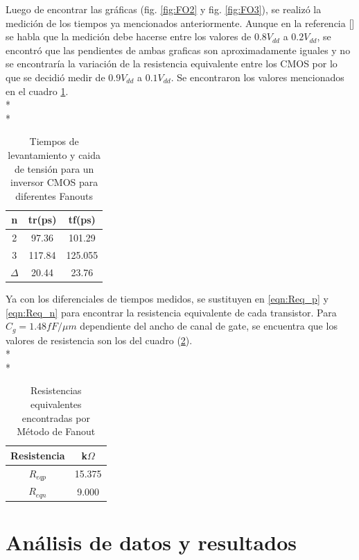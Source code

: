\documentclass[12pt,a4paper]{article} %
\begin{document}
Luego de encontrar las gráficas (fig. \ref{fig:FO2} y fig. \ref{fig:FO3}), se realizó la medición de los tiempos ya mencionados anteriormente. Aunque en la referencia [] se habla que la medición debe hacerse entre los valores de $0.8V_{dd}$ a $0.2V_{dd}$, se encontró que las pendientes de ambas graficas son aproximadamente iguales y no se encontraría la variación de la resistencia equivalente entre los CMOS por lo que se decidió medir de $0.9V_{dd}$ a $0.1V_{dd}$. Se encontraron los valores mencionados en el cuadro \ref{table:tiempos}. \\*
\\*
\begin{table}\label{table:tiempos}
\begin{center}
\begin{tabular}{c||c||c}
n & tr(ps) & tf(ps)\\
\hline
\hline
2 & 97.36 & 101.29 \\
3 & 117.84 & 125.055 \\
$\Delta$ & 20.44 & 23.76\\
\hline
\end{tabular}
\caption{Tiempos de levantamiento y caida de tensión para un inversor CMOS para diferentes Fanouts}
\end{center}
\end{table}


Ya con los diferenciales de tiempos medidos, se sustituyen en \ref{eqn:Req_p} y \ref{eqn:Req_n} para encontrar la resistencia equivalente de cada transistor. Para $C_{g}=1.48 fF/\mu m$  dependiente del ancho de canal de gate, se encuentra que los valores de resistencia son los del cuadro (\ref{table:resistencias}). \\*
\\*
\begin{table}\label{table:resistencias}
\begin{center}
\begin{tabular}{c||c}
Resistencia & k$\Omega$\\
\hline
\hline
$R_{eqp}$ & 15.375 \\
$R_{eqn}$ & 9.000 \\
\hline
\end{tabular}
\caption{Resistencias equivalentes encontradas por Método de Fanout}
\end{center}
\end{table}

\section{Análisis de datos y resultados}
\end{document}
